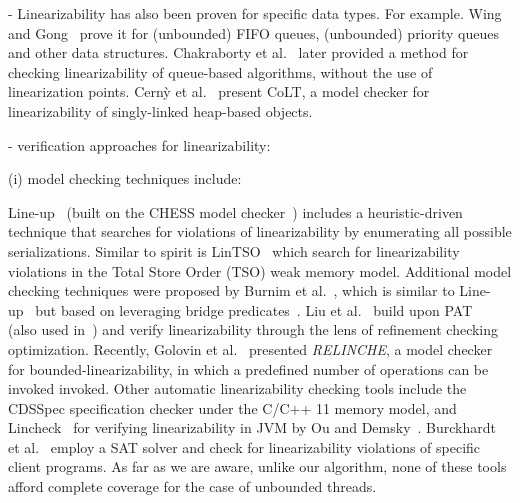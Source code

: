 - Linearizability has also been proven for specific data types. For example. Wing and Gong~\cite{WiGo93} prove it for  (unbounded) FIFO queues, (unbounded) priority queues and other data structures. Chakraborty et al.~\cite{ChHeSeVa15} later provided a method for checking linearizability of queue-based algorithms, without the use of linearization points. Cern{\`y} et al.~\cite{CeRaZuChAl10} present CoLT, a model checker for linearizability of singly-linked heap-based objects.




- verification approaches for linearizability:



(i) model checking techniques include:

Line-up~\cite{BuDeMuTa10} (built on the CHESS model checker~\cite{MuQaBaBaNaNe08}) includes a heuristic-driven technique that searches for violations of linearizability by enumerating all possible serializations. Similar to spirit is LinTSO~\cite{BuGoMuYa12} which search for linearizability violations in the Total Store
Order (TSO) weak memory model.
%
Additional model checking techniques were proposed by Burnim et al.~\cite{BuNeSe11}, which is similar to  Line-up~\cite{BuDeMuTa10} but based on leveraging bridge predicates~\cite{BuSe09}. 
Liu et al.~\cite{LiChLiSuZhDo12} build upon PAT~\cite{SuLuDoPa09} (also used in~\cite{LiChLiSu09,Zh11}) and verify linearizability through the lens of refinement checking optimization.
%
%
Recently, Golovin et al.~\cite{GoKoVa25} presented \textit{RELINCHE}, a model checker for bounded-linearizability, in which a predefined number of operations can be invoked invoked.
%
Other automatic linearizability checking tools include the CDSSpec specification checker under the C/C++ 11 memory model, and Lincheck~\cite{KoDeSoTsAl23} for verifying linearizability in JVM by Ou and Demsky~\cite{OuDe17}. 
%
Burckhardt et al.~\cite{BuAlMa07} employ a SAT solver and check for linearizability violations of specific client programs.
%
As far as we are aware, unlike our algorithm, none of these tools afford complete coverage for the case of unbounded threads.
%

